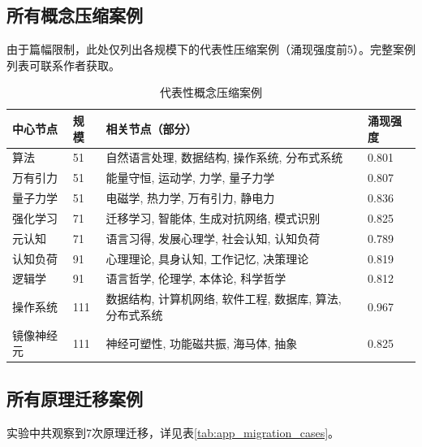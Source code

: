 \documentclass[12pt,a4paper]{article}
\begin{document}
\subsection{所有概念压缩案例}

由于篇幅限制，此处仅列出各规模下的代表性压缩案例（涌现强度前5）。完整案例列表可联系作者获取。

\begin{table}[H]
\centering
\caption{代表性概念压缩案例}
\label{tab:app_compression_cases}
\begin{tabular}{p{2.5cm}p{1cm}p{4.5cm}p{2cm}}
\toprule
\textbf{中心节点} & \textbf{规模} & \textbf{相关节点（部分）} & \textbf{涌现强度} \\
\midrule
算法 & 51 & 自然语言处理, 数据结构, 操作系统, 分布式系统 & 0.801 \\
万有引力 & 51 & 能量守恒, 运动学, 力学, 量子力学 & 0.807 \\
量子力学 & 51 & 电磁学, 热力学, 万有引力, 静电力 & 0.836 \\
\addlinespace
强化学习 & 71 & 迁移学习, 智能体, 生成对抗网络, 模式识别 & 0.825 \\
元认知 & 71 & 语言习得, 发展心理学, 社会认知, 认知负荷 & 0.789 \\
\addlinespace
认知负荷 & 91 & 心理理论, 具身认知, 工作记忆, 决策理论 & 0.819 \\
逻辑学 & 91 & 语言哲学, 伦理学, 本体论, 科学哲学 & 0.812 \\
\addlinespace
操作系统 & 111 & 数据结构, 计算机网络, 软件工程, 数据库, 算法, 分布式系统 & 0.967 \\
镜像神经元 & 111 & 神经可塑性, 功能磁共振, 海马体, 抽象 & 0.825 \\
\bottomrule
\end{tabular}
\end{table}

\subsection{所有原理迁移案例}

实验中共观察到7次原理迁移，详见表\ref{tab:app_migration_cases}。
\end{document}
